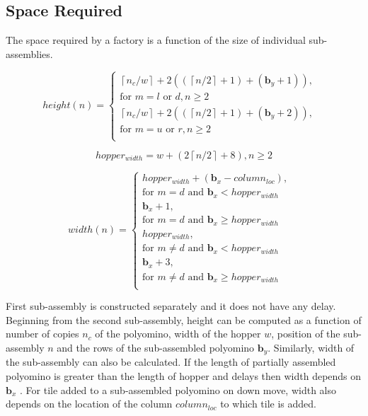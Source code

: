 \subsection{Space Required}\label{sec:requiredSpace}
The space required by a factory is a function of the size of individual sub-assemblies.


$$
height(n)=
\begin{cases}
\left \lceil{n_c/w}\right \rceil+2((\left \lceil{n/2}\right \rceil+1)+(\mathbf{b}_y+1)),&\\ 
\text{for } m = l \text{ or } d, n \geq 2&\\
\left \lceil{n_c/w}\right \rceil+2((\left \lceil{n/2}\right \rceil+1)+(\mathbf{b}_y+2)),&\\ 
\text{for } m = u \text{ or } r, n\geq 2&\\

\end{cases}
$$

\begin{equation}
hopper_{width}=w+(2\left \lceil{n/2}\right \rceil+8),  n \geq 2
\end{equation}

$$
width(n)=
\begin{cases}
hopper_{width}+(\mathbf{b}_x-column_{loc}),&\\ 
\text{for } m = d \text{ and } \mathbf{b}_x < hopper_{width}&\\
\mathbf{b}_x + 1,&\\ 
\text{for } m = d \text{ and } \mathbf{b}_x \geq hopper_{width}&\\
hopper_{width},&\\ 
\text{for } m \neq d  \text{ and } \mathbf{b}_x < hopper_{width}&\\
\mathbf{b}_x + 3,&\\ 
\text{for } m \neq d \text{ and } \mathbf{b}_x \geq hopper_{width}&\\
\end{cases}
$$

First sub-assembly is constructed separately and it does not have any delay.
Beginning from the second sub-assembly, height can be computed as a function of number of copies $n_c$ of the polyomino, width of the hopper $w$, position of the sub-assembly $n$ and the rows of the sub-assembled polyomino $\mathbf{b}_y$.
Similarly, width of the sub-assembly can also be calculated. If the length of partially assembled polyomino is greater than the length of hopper and delays then width depends on $\mathbf{b}_x$ . For tile added to a sub-assembled polyomino on down move, width also depends on the location of the column $column_{loc}$ to which tile is added.  


